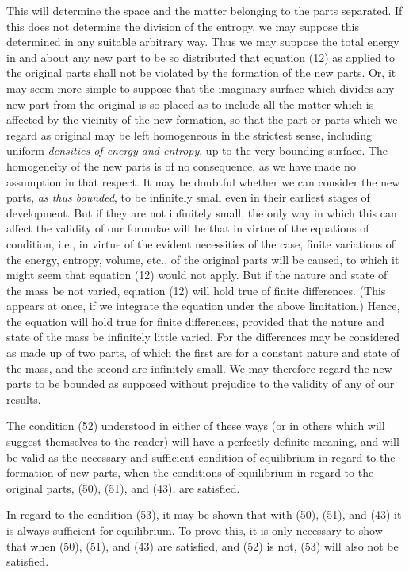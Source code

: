 \documentclass[12pt]{article}
\begin{document}
This will determine the space and the matter belonging to the parts separated. If this does not determine the division of the entropy, we may suppose this determined in any suitable arbitrary way. Thus we may suppose the total energy in and about any new part to be so distributed that equation (12) as applied to the original parts shall not be violated by the formation of the new parts. Or, it may seem more simple to suppose that the imaginary surface which divides any new part from the original is so placed as to include all the matter which is affected by the vicinity of the new formation, so that the part or parts which we regard as original may be left homogeneous in the strictest sense, including uniform \textit{densities of energy and entropy}, up to the very bounding surface. The homogeneity of the new parts is of no consequence, as we have made no assumption in that respect. It may be doubtful whether we can consider the new parts, \textit{as thus bounded}, to be infinitely small even in their earliest stages of development. But if they are not infinitely small, the only way in which this can affect the validity of our formulae will be that in virtue of the equations of condition, i.e., in virtue of the evident necessities of the case, finite variations of the energy, entropy, volume, etc., of the original parts will be caused, to which it might seem that equation (12) would not apply. But if the nature and state of the mass be not varied, equation (12) will hold true of finite differences. (This appears at once, if we integrate the equation under the above limitation.) Hence, the equation will hold true for finite differences, provided that the nature and state of the mass be infinitely little varied. For the differences may be considered as made up of two parts, of which the first are for a constant nature and state of the mass, and the second are infinitely small. We may therefore regard the new parts to be bounded as supposed without prejudice to the validity of any of our results.


The condition (52) understood in either of these ways (or in others which will suggest themselves to the reader) will have a perfectly definite meaning, and will be valid as the necessary and sufficient condition of equilibrium in regard to the formation of new parts, when the conditions of equilibrium in regard to the original parts, (50), (51), and (43), are satisfied.


In regard to the condition (53), it may be shown that with (50), (51), and (43) it is always sufficient for equilibrium. To prove this, it is only necessary to show that when (50), (51), and (43) are satisfied, and (52) is not, (53) will also not be satisfied.
\end{document}
